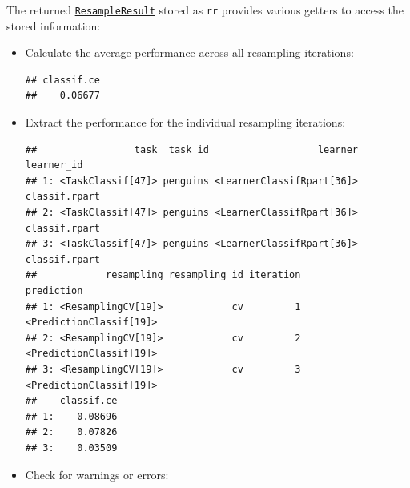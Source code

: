 \documentclass[
]{scrbook}
\newenvironment{Shaded}{\begin{snugshade}}{\end{snugshade}}
\newcommand{\FunctionTok}[1]{\textcolor[rgb]{0.00,0.00,0.00}{#1}}
\newcommand{\NormalTok}[1]{#1}
\newcommand{\SpecialCharTok}[1]{\textcolor[rgb]{0.00,0.00,0.00}{#1}}
\newcommand{\StringTok}[1]{\textcolor[rgb]{0.31,0.60,0.02}{#1}}
\renewenvironment{Shaded} {\begin{snugshade}\small} {\end{snugshade}}
\begin{document}
The returned \href{https://mlr3.mlr-org.com/reference/ResampleResult.html}{\texttt{ResampleResult}} stored as \texttt{rr} provides various getters to access the stored information:

\begin{itemize}
\item
  Calculate the average performance across all resampling iterations:

\begin{Shaded}
\end{Shaded}

\begin{verbatim}
## classif.ce 
##    0.06677
\end{verbatim}
\item
  Extract the performance for the individual resampling iterations:

\begin{Shaded}
\end{Shaded}

\begin{verbatim}
##                 task  task_id                   learner    learner_id
## 1: <TaskClassif[47]> penguins <LearnerClassifRpart[36]> classif.rpart
## 2: <TaskClassif[47]> penguins <LearnerClassifRpart[36]> classif.rpart
## 3: <TaskClassif[47]> penguins <LearnerClassifRpart[36]> classif.rpart
##            resampling resampling_id iteration              prediction
## 1: <ResamplingCV[19]>            cv         1 <PredictionClassif[19]>
## 2: <ResamplingCV[19]>            cv         2 <PredictionClassif[19]>
## 3: <ResamplingCV[19]>            cv         3 <PredictionClassif[19]>
##    classif.ce
## 1:    0.08696
## 2:    0.07826
## 3:    0.03509
\end{verbatim}
\item
  Check for warnings or errors:

\begin{Shaded}
\end{Shaded}


\end{itemize}
\end{document}
